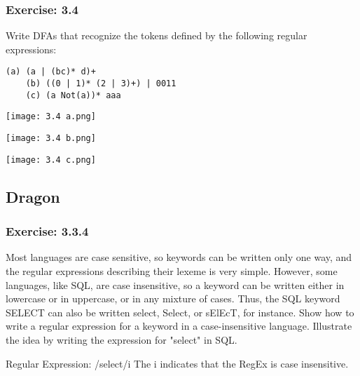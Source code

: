 \documentclass[letterpaper, 10pt,DIV=13]{scrartcl}
\numberwithin{equation}{section} %
\numberwithin{figure}{section} %
\numberwithin{table}{section} %
\begin{document}
\subsubsection*{Exercise: 3.4}
 Write DFAs that recognize the tokens defined by the following regular expressions:
    \lstset{numbers=left, numberstyle=\tiny, stepnumber=1, numbersep=5pt, basicstyle=\footnotesize\ttfamily}
    \begin{lstlisting}[frame=single, ]
    (a) (a | (bc)* d)+
    (b) ((0 | 1)* (2 | 3)+) | 0011
    (c) (a Not(a))* aaa
    \end{lstlisting}
    \begin{center}
    \texttt{[image: 3.4 a.png]}
    \end{center}
    \begin{center}
    \texttt{[image: 3.4 b.png]}
    \end{center}
    \begin{center}
    \texttt{[image: 3.4 c.png]}
    \end{center}

\subsection*{Dragon}

\subsubsection*{Exercise: 3.3.4}
Most languages are case sensitive, so keywords can be written only one way, and the regular expressions describing their lexeme is very simple. However, some languages, like SQL, are case insensitive, so a keyword can be written either in lowercase or in uppercase, or in any mixture of cases. Thus, the SQL keyword SELECT can also be written select, Select, or sElEcT, for instance. Show how to write a regular expression for a keyword in a case-insensitive language. Illustrate the idea by writing the expression for "select" in SQL.

Regular Expression: /select/i
\newline
The i indicates that the RegEx is case insensitive.



\pagebreak

\end{document}
